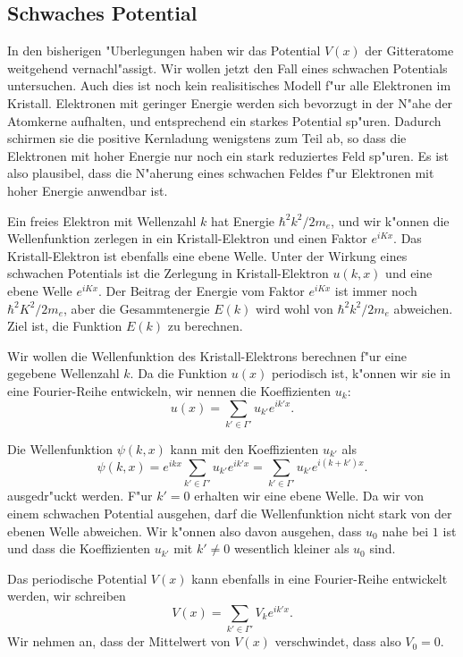 \subsection{Schwaches Potential}
In den bisherigen "Uberlegungen haben wir das Potential $V(x)$ der Gitteratome
weitgehend vernachl"assigt.
Wir wollen jetzt den Fall eines schwachen Potentials untersuchen.
Auch dies ist noch kein realisitisches Modell f"ur alle Elektronen im 
Kristall. Elektronen mit geringer Energie werden sich bevorzugt in der
N"ahe der Atomkerne aufhalten, und entsprechend ein starkes Potential
sp"uren.
Dadurch schirmen sie die positive Kernladung wenigstens zum Teil ab, 
so dass die Elektronen mit hoher Energie nur noch ein stark reduziertes
Feld sp"uren. Es ist also plausibel, dass die N"aherung eines schwachen
Feldes f"ur Elektronen mit hoher Energie anwendbar ist.

Ein freies Elektron mit Wellenzahl $k$ hat Energie $\hbar^2k^2/2m_e$, und wir
k"onnen die Wellenfunktion zerlegen in ein Kristall-Elektron und einen
Faktor $e^{iKx}$.
Das Kristall-Elektron ist ebenfalls eine ebene Welle.
Unter der Wirkung eines schwachen Potentials ist die Zerlegung in
Kristall-Elektron $u(k,x)$ und eine ebene Welle $e^{iKx}$.
Der Beitrag der Energie vom Faktor $e^{iKx}$ ist immer noch $\hbar^2K^2/2m_e$,
aber die Gesammtenergie $E(k)$ wird wohl von $\hbar^2k^2/2m_e$ abweichen.
Ziel ist, die Funktion $E(k)$ zu berechnen.

Wir wollen die Wellenfunktion des Kristall-Elektrons berechnen 
f"ur eine gegebene Wellenzahl $k$.
Da die Funktion $u(x)$ periodisch ist, k"onnen wir sie in eine Fourier-Reihe
entwickeln, wir nennen die Koeffizienten $u_k$:
\[
u(x)=\sum_{k'\in\Gamma'} u_{k'} e^{ik'x}.
\]

Die Wellenfunktion $\psi(k,x)$ kann mit den Koeffizienten $u_{k'}$ als
\[
\psi(k,x)
=
e^{ikx}\sum_{k'\in\Gamma'}u_{k'}e^{ik'x}
=
\sum_{k'\in\Gamma'}u_{k'}e^{i(k+k')x}.
\]
ausgedr"uckt werden.
F"ur $k'=0$ erhalten wir eine ebene Welle.
Da wir von einem schwachen Potential ausgehen, darf die Wellenfunktion
nicht stark von der ebenen Welle abweichen. Wir k"onnen also davon ausgehen,
dass $u_0$ nahe bei $1$ ist und dass die Koeffizienten $u_{k'}$
mit $k'\ne 0$ wesentlich kleiner als $u_0$ sind.

Das periodische Potential $V(x)$ kann ebenfalls in eine Fourier-Reihe
entwickelt werden, wir schreiben
\[
V(x) = \sum_{k'\in\Gamma'}V_ke^{ik'x}.
\]
Wir nehmen an, dass der Mittelwert von $V(x)$ verschwindet, dass also $V_0=0$.


